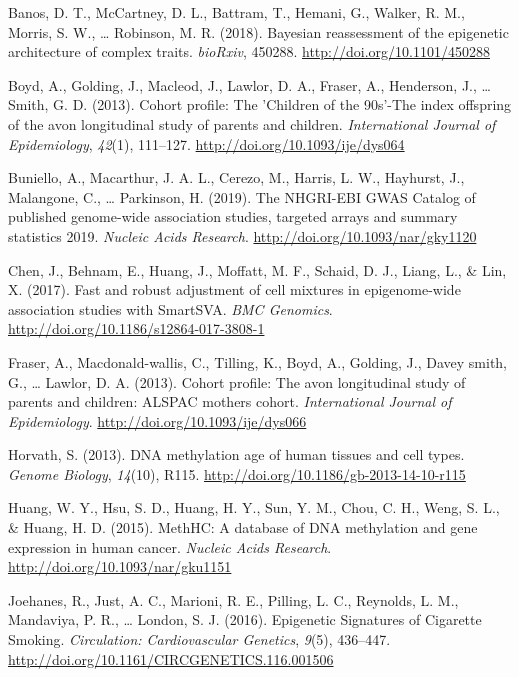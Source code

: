 \documentclass[11pt,twoside]{bristolthesis}
\newlength{\cslhangindent}
\newenvironment{cslreferences}%
  {\setlength{\parindent}{0pt}%
  \everypar{\setlength{\hangindent}{\cslhangindent}}\ignorespaces}%
  {\par}
\begin{document}
\hypertarget{refs}{}
\begin{cslreferences}
\leavevmode\hypertarget{ref-Banos2018}{}%
Banos, D. T., McCartney, D. L., Battram, T., Hemani, G., Walker, R. M., Morris, S. W., \ldots{} Robinson, M. R. (2018). Bayesian reassessment of the epigenetic architecture of complex traits. \emph{bioRxiv}, 450288. \url{http://doi.org/10.1101/450288}

\leavevmode\hypertarget{ref-Boyd2013}{}%
Boyd, A., Golding, J., Macleod, J., Lawlor, D. A., Fraser, A., Henderson, J., \ldots{} Smith, G. D. (2013). Cohort profile: The 'Children of the 90s'-The index offspring of the avon longitudinal study of parents and children. \emph{International Journal of Epidemiology}, \emph{42}(1), 111--127. \url{http://doi.org/10.1093/ije/dys064}

\leavevmode\hypertarget{ref-Buniello2019}{}%
Buniello, A., Macarthur, J. A. L., Cerezo, M., Harris, L. W., Hayhurst, J., Malangone, C., \ldots{} Parkinson, H. (2019). The NHGRI-EBI GWAS Catalog of published genome-wide association studies, targeted arrays and summary statistics 2019. \emph{Nucleic Acids Research}. \url{http://doi.org/10.1093/nar/gky1120}

\leavevmode\hypertarget{ref-Chen2017}{}%
Chen, J., Behnam, E., Huang, J., Moffatt, M. F., Schaid, D. J., Liang, L., \& Lin, X. (2017). Fast and robust adjustment of cell mixtures in epigenome-wide association studies with SmartSVA. \emph{BMC Genomics}. \url{http://doi.org/10.1186/s12864-017-3808-1}

\leavevmode\hypertarget{ref-Fraser2013}{}%
Fraser, A., Macdonald-wallis, C., Tilling, K., Boyd, A., Golding, J., Davey smith, G., \ldots{} Lawlor, D. A. (2013). Cohort profile: The avon longitudinal study of parents and children: ALSPAC mothers cohort. \emph{International Journal of Epidemiology}. \url{http://doi.org/10.1093/ije/dys066}

\leavevmode\hypertarget{ref-Horvath2013}{}%
Horvath, S. (2013). DNA methylation age of human tissues and cell types. \emph{Genome Biology}, \emph{14}(10), R115. \url{http://doi.org/10.1186/gb-2013-14-10-r115}

\leavevmode\hypertarget{ref-Huang2015}{}%
Huang, W. Y., Hsu, S. D., Huang, H. Y., Sun, Y. M., Chou, C. H., Weng, S. L., \& Huang, H. D. (2015). MethHC: A database of DNA methylation and gene expression in human cancer. \emph{Nucleic Acids Research}. \url{http://doi.org/10.1093/nar/gku1151}

\leavevmode\hypertarget{ref-Joehanes2016}{}%
Joehanes, R., Just, A. C., Marioni, R. E., Pilling, L. C., Reynolds, L. M., Mandaviya, P. R., \ldots{} London, S. J. (2016). Epigenetic Signatures of Cigarette Smoking. \emph{Circulation: Cardiovascular Genetics}, \emph{9}(5), 436--447. \url{http://doi.org/10.1161/CIRCGENETICS.116.001506}


\end{cslreferences}
\end{document}
